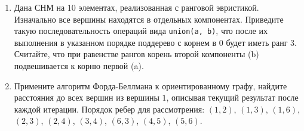 \documentclass[a4paper,10pt]{article}
\begin{document}
\begin{enumerate}
    \vskip 3.5cm

    \item Дана СНМ на 10 элементах, реализованная с ранговой эвристикой. Изначально все
    вершины находятся в отдельных компонентах. Приведите такую последовательность операций
    вида \texttt{union(a, b)}, что после их выполнения в указанном порядке поддерево с
    корнем в $0$ будет иметь ранг $3$. Считайте, что при равенстве рангов корень второй
    компоненты (b) подвешивается к корню первой (a).

    \vskip 3.5cm

    \item Примените алгоритм Форда-Беллмана к ориентированному графу, найдите расстояния
    до всех вершин из вершины $1$, описывая текущий результат после каждой итерации.
    Порядок ребер для рассмотрения: $(1, 2)$, $(1, 3)$, $(1, 6)$, $(2, 3)$, $(2, 4)$,
    $(3, 4)$, $(6, 3)$, $(4, 5)$, $(5, 6)$.
        
      \begin{center}
      \end{center}

  \end{enumerate}
\end{document}
